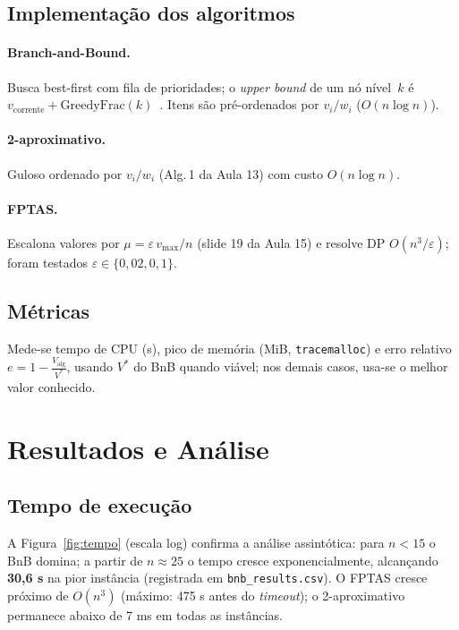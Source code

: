 \documentclass[10pt,a4paper]{article}
\begin{document}
\subsection{Implementação dos algoritmos}
\paragraph{Branch-and-Bound.}
Busca best-first com fila de prioridades; o \emph{upper bound} de um
nó nível~$k$ é
$v_{\text{corrente}}+\mathrm{GreedyFrac}(k)$~\cite{aula12}.  Itens são
pré-ordenados por $v_i/w_i$ ($O(n\log n)$).

\paragraph{2-aproximativo.}
Guloso ordenado por $v_i/w_i$ (Alg.\,1 da Aula 13) com custo
$O(n\log n)$.

\paragraph{FPTAS.}
Escalona valores por
$\mu=\varepsilon\,v_{\max}/n$ (slide 19 da Aula 15) e resolve DP
$O(n^{3}/\varepsilon)$; foram testados
$\varepsilon\in\{0{,}02,0{,}1\}$.

\subsection{Métricas}
Mede-se tempo de CPU (s), pico de memória (MiB, \texttt{tracemalloc}) e
erro relativo
$e=1-\tfrac{V_{\text{alg}}}{V^*}$, usando $V^*$ do BnB
quando viável; nos demais casos, usa-se o melhor valor conhecido.

\section{Resultados e Análise}\label{sec:res}
\subsection{Tempo de execução}\label{sec:tempo}
A Figura~\ref{fig:tempo} (escala log) confirma a análise assintótica:
para $n<15$ o BnB domina; a partir de $n\!\approx\!25$ o tempo cresce
exponencialmente, alcançando \textbf{30,6 s} na pior instância
(registrada em \texttt{bnb\_results.csv}). O FPTAS cresce próximo de
$O(n^{3})$ (máximo: 475 s antes do \textit{timeout}); o 2-aproximativo
permanece abaixo de 7 ms em todas as instâncias.
\end{document}
